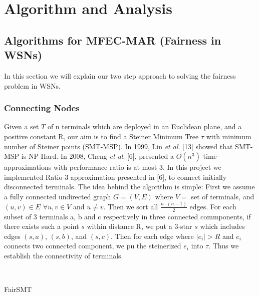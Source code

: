 \section{Algorithm and Analysis}\label{analysis}

\subsection{Algorithms for MFEC-MAR (Fairness in WSNs)}
In this section we will explain our two step approach to solving the fairness problem in WSNs.

\subsubsection{Connecting Nodes}
Given a set $T$ of n terminals which are deployed in an Euclidean plane, and a positive constant R, our aim is to find a Steiner Minimum Tree $\tau$ with minimum number of Steiner points (SMT-MSP). In 1999, Lin \textit{et al}. [13] showed that SMT-MSP is NP-Hard. In 2008, Cheng \textit{et al}. [6], presented a $O(n^{3})$-time approximations with performance ratio is at most 3. In this project we implemented Ratio-3 approximation presented in [6], to connect initially disconnected terminals. The idea behind the algorithm is simple: First we assume a fully connected undirected graph $G=(V,E)$ where $V=$ set of terminals, and $(u,v)\in E$ $\forall u,v \in V$ and $u\neq v$. Then we sort all $\frac{n\cdot(n-1)}{2}$ edges. For each subset of 3 terminals a, b and c respectively in three connected commponents, if there exists such a point $s$ within distance R, we put a 3-star $s$ which includes edges $(s,a)$, $(s,b)$, and $(s,c)$. Then for each edge where $\left|e_i\right| > R$ and $e_i$ connects two connected component, we pu the steinerized $e_i$ into $\tau$. Thus we establish the connectivity of terminals.

\linesnumbered
\begin{algorithm}

\dontprintsemicolon
{}
\\
\caption{FairSMT\label{IR}}
\end{algorithm}


